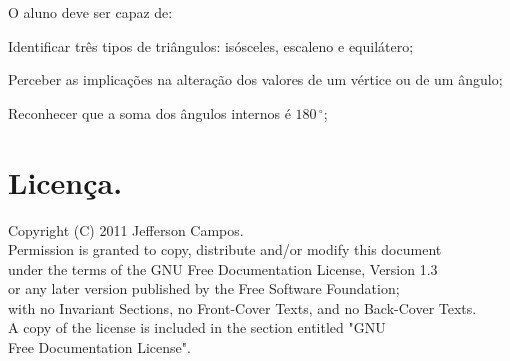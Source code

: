 \documentclass[a4paper,12pt]{article}
\begin{document}
O aluno deve ser capaz de:
\begin{list}{) }{}
\item Identificar três tipos de triângulos: isósceles, escaleno e equilátero;
\item Perceber as implicações na alteração dos valores de um vértice ou de um ângulo;
\item Reconhecer que a soma dos ângulos internos é $180\,^{\circ}$;
\end{list}

\section{Licença.}

Copyright (C)  2011 Jefferson Campos.\\
Permission is granted to copy, distribute and/or modify this document\\
under the terms of the GNU Free Documentation License, Version 1.3\\
or any later version published by the Free Software Foundation;\\
with no Invariant Sections, no Front-Cover Texts, and no Back-Cover Texts.\\
A copy of the license is included in the section entitled "GNU\\
Free Documentation License".

\nocite{website:aula_geogebra}
\nocite{texbook:matematica_em}


\end{document}
